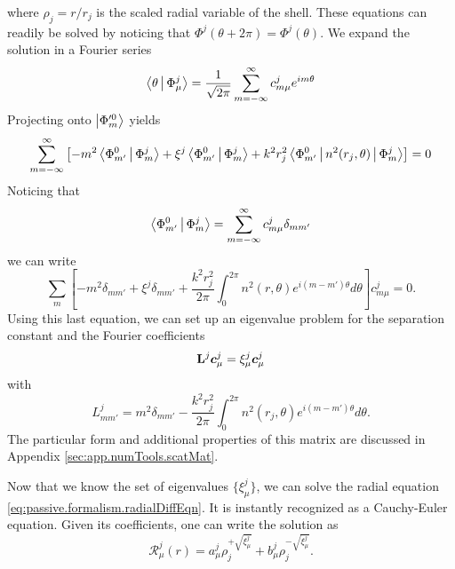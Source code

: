 where $\rho_j=r/r_j$ is the scaled radial variable of the shell. 
These equations can readily be solved by noticing that
$\Phi^j(\theta+2\pi)=\Phi^j(\theta)$. We expand the solution
in a Fourier series
  \begin{equation}
   \Braket{\theta|\Phi_\mu^j} = \frac{1}{\sqrt{2\pi}}\sum_{m=-\infty}^\infty c_{m\mu}^je^{im\theta}
  \end{equation}
Projecting onto $\Ket{\Phi_m'^0}$ yields
\begin{equation}
    \sum_{m=-\infty}^\infty\left[-m^2\Braket{\Phi_{m'}^0|\Phi_m^j}+\xi^j\Braket{\Phi_{m'}^0|\Phi_m^j}+k^2r_j^2\Braket{\Phi_{m'}^0|n^2(r_j,\theta)|\Phi_m^j}\right]=0
  \end{equation}
Noticing that 
  \begin{equation}
    \Braket{\Phi_{m'}^0|\Phi_{m}^j} = \sum_{m=-\infty}^\infty c_{m\mu}^j \delta_{mm'}
  \end{equation}
we can write
  \begin{equation}
    \sum_m\left[-m^2\delta_{mm'}+\xi^j\delta_{mm'} + \frac{k^2r_j^2}{2\pi}\int_{0}^{2\pi}n^2(r,\theta)e^{i(m-m')\theta}d\theta\right]c_{m\mu}^j =0.
  \end{equation}
Using this last equation, we can set up an eigenvalue 
problem for the separation constant and the Fourier coefficients
  \begin{equation}
   \label{eq:passive.numerical.eigenvalue}
   \mathbf{L}^j\boldsymbol{c}_\mu^j=\xi_\mu^j\boldsymbol{c}_\mu^j
  \end{equation}
with
  \begin{equation}
    L_{mm'}^j = m^2\delta_{mm'}-\frac{k^2r_j^2}{2\pi}\int_0^{2\pi}n^2(r_j,\theta)e^{i(m-m')\theta}d\theta.
  \end{equation}
The particular form and additional properties of this matrix are discussed in 
Appendix \ref{sec:app.numTools.scatMat}.

Now that we know the set of eigenvalues $\{\xi_\mu^j\}$, we can solve the radial
equation \eqref{eq:passive.formalism.radialDiffEqn}. It is instantly recognized as 
a Cauchy-Euler equation. Given its coefficients, one can write the solution 
as \cite[p.~118-119]{GRE98}
  \begin{equation}
    \label{eq:sMatrix.radialSolution}
    \mathcal{R}_\mu^j(r) =  a_\mu^j\rho_j^{+\sqrt{\xi_\mu^j}}+b_\mu^j\rho_j^{-\sqrt{\xi_\mu^j}}.
  \end{equation}
  
